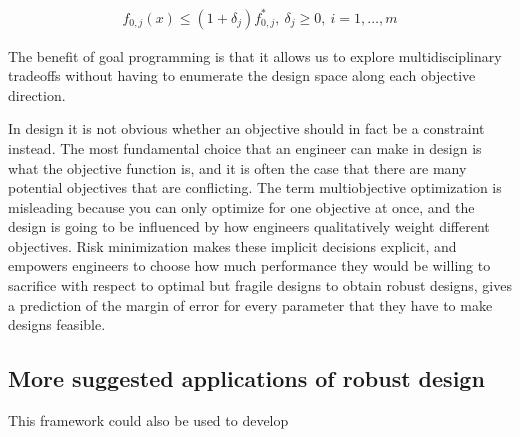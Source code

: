 \begin{align*}
    f_{0,j}(x) \leq (1+\delta_j) f^*_{0,j},~\delta_j \geq 0,~i = 1,\ldots, m
    \label{eq:multigoal}
\end{align*}

The benefit of goal programming is that it allows us to explore multidisciplinary tradeoffs without
having to enumerate the design space along each objective direction.

In design it is not obvious whether an objective should in fact be a constraint instead. The most
fundamental choice that an engineer can make in design is what the objective function is, and it is
often the case that there are many potential objectives that are conflicting. The term multiobjective optimization is misleading
because you can only optimize for one objective at once,
and the design is going to be influenced by how engineers qualitatively weight different objectives.
Risk minimization makes these implicit decisions explicit, and empowers engineers to choose
how much performance they would be willing to sacrifice with respect
to optimal but fragile designs to obtain robust designs, gives a prediction of the margin of error
for every parameter that they have to make designs feasible.

\subsection{More suggested applications of robust design}

This framework could also be used to develop
